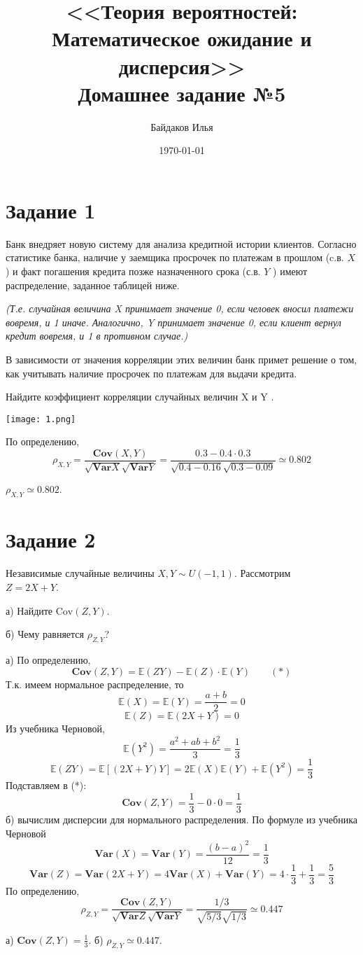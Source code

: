 \documentclass[a4paper,12pt]{article}
\newcommand{\ssolve}{\par\vspace{5pt}\noindent{\bf Решение. }\par}
\newcommand{\aanswer}{\par\vspace{5pt}\noindent{\bf Ответ. }}
\newcommand{\E}{\mathbb{E}}
\newcommand{\Var}{\textbf{Var}}
\newcommand{\Cov}{\textbf{Cov}}
\begin{document}
\title{<<Теория вероятностей:\\ Математическое ожидание и дисперсия>>\\ \vspace{12pt} Домашнее задание №5}
\author{Байдаков Илья}
\date{\today}
\maketitle

\section*{Задание 1}
Банк внедряет новую систему для анализа кредитной истории клиентов. Согласно статистике
банка, наличие у заемщика просрочек по платежам в прошлом (c.в. $X$) и факт погашения кредита позже назначенного срока (с.в. $Y$ ) имеют распределение, заданное таблицей ниже. \par
\textit{(Т.е. случайная величина X принимает значение 0, если человек вносил платежи вовремя, и 1 иначе. Аналогично, Y принимает значение 0, если клиент вернул кредит вовремя, и 1 в противном случае.)} \par
В зависимости от значения корреляции этих величин банк примет решение о том, как учитывать наличие просрочек по платежам для выдачи кредита. \par
Найдите коэффициент корреляции случайных величин X и Y .
\par
\texttt{[image: 1.png]}\par
\ssolve
По определению,
$$\rho_{X,Y} = \frac{\textbf{Cov}(X,Y)}{\sqrt{\textbf{Var}X}\sqrt{\textbf{Var}Y}}=\frac{0.3-0.4\cdot0.3}{\sqrt{0.4-0.16}\sqrt{0.3-0.09}}\simeq0.802$$
\aanswer $\rho_{X,Y} \simeq 0.802$.



\section*{Задание 2}
Независимые случайные величины $X,Y\sim U(-1,1)$. Рассмотрим \\ $Z=2X+Y$. \par
а) Найдите $\text{Cov}(Z, Y )$. \par
б) Чему равняется $\rho_{Z,Y}$?
\ssolve
а) По определению, $$\textbf{Cov}(Z,Y)=\E (ZY) - \E(Z)\cdot\E (Y) \qquad (*)$$
Т.к. имеем нормальное распределение, то
$$\E(X)= \E(Y)=\frac{a+b}{2}=0$$
$$\E(Z)=\E(2X+Y)=0$$
Из учебника Черновой,
$$\E(Y^2) = \frac{a^2+ab+b^2}{3}=\frac{1}{3}$$
$$\E(ZY)=\E[(2X+Y)Y]=2\E(X)\E(Y)+\E(Y^2)=\frac{1}{3}$$
Подставляем в (*):
$$\textbf{Cov}(Z,Y)=\frac{1}{3}-0\cdot0=\frac{1}{3}$$
б) вычислим дисперсии для нормального распределения. 
По формуле из учебника Черновой
$$\Var (X)= \Var (Y)=\frac{(b-a)^2}{12}=\frac{1}{3}$$
$$\Var(Z) = \Var(2X+Y)=4\Var(X)+\Var(Y)=4\cdot\frac{1}{3}+\frac{1}{3}=\frac{5}{3}$$
По определению,
$$\rho_{Z,Y}=\frac{\Cov (Z,Y)}{\sqrt{\Var Z}\sqrt{\Var Y}}=\frac{1/3}{\sqrt{5/3}\sqrt{1/3}} \simeq 0.447$$
\aanswer а) $\Cov(Z,Y) = \frac{1}{3}.$ б) $\rho_{Z,Y} \simeq 0.447$.
\end{document}
